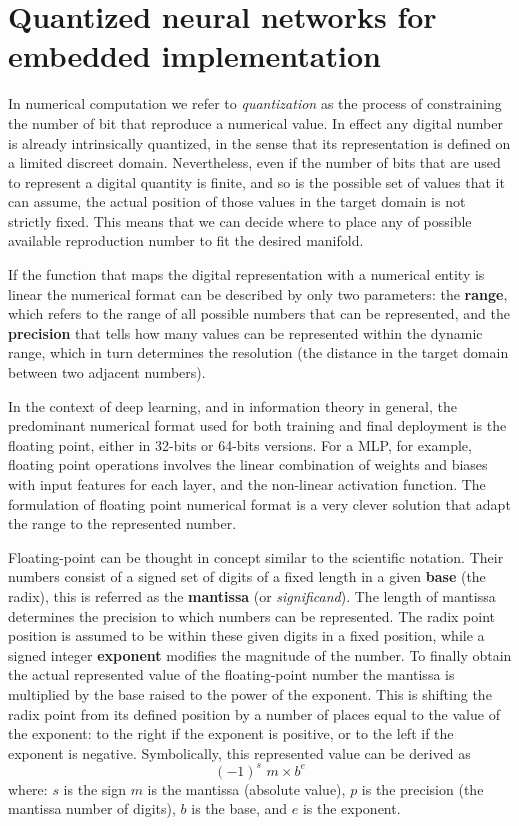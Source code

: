 %
\section{Quantized neural networks for embedded implementation}
\label{section:quantum}

In numerical computation we refer to \textit{quantization} as the process of constraining the number of bit that reproduce a numerical value. In effect any digital number is already intrinsically quantized, in the sense that its representation is defined on a limited discreet domain. 
Nevertheless, even if the number of bits that are used to represent a digital quantity is finite, and so is the possible set of values that it can assume, the actual position of those values in the target domain is not strictly fixed. This means that we can decide where to place any of possible available reproduction number to fit the desired manifold.

If the function that maps the digital representation with a numerical entity is linear the numerical format can be described by only two parameters: the \textbf{range}, which refers to the range of all possible numbers that can be represented, and the \textbf{precision} that tells how many values can be represented within the dynamic range, which in turn determines the resolution (the distance in the target domain between two adjacent numbers).

In the context of deep learning, and in information theory in general, the predominant numerical format used for both training and final deployment is the floating point, either in 32-bits or 64-bits versions. For a \acs{MLP}, for example, floating point operations involves the linear combination of weights and biases with input features for each layer, and the non-linear activation function. The formulation of floating point numerical format is a very clever solution that adapt the range to the represented number.

Floating-point can be thought in concept similar to the scientific notation. Their numbers consist of a signed set of digits of a fixed length in a given \textbf{base} (the radix), this is referred as the \textbf{mantissa} (or \textit{significand}). The length of mantissa determines the precision to which numbers can be represented. The radix point position is assumed to be within these given digits in a fixed position, while a signed integer \textbf{exponent} modifies the magnitude of the number.
To finally obtain the actual represented value of the floating-point number the mantissa is multiplied by the base raised to the power of the exponent. This is shifting the radix point from its defined position by a number of places equal to the value of the exponent: to the right if the exponent is positive, or to the left if the exponent is negative.
Symbolically, this represented value can be derived as 
%
$$ (-1)^s \,\, m \times b^e $$
%
where: $s$ is the sign $m$ is the mantissa (absolute value), $p$ is the precision (the mantissa number of digits), $b$ is the base, and $e$ is the exponent.

